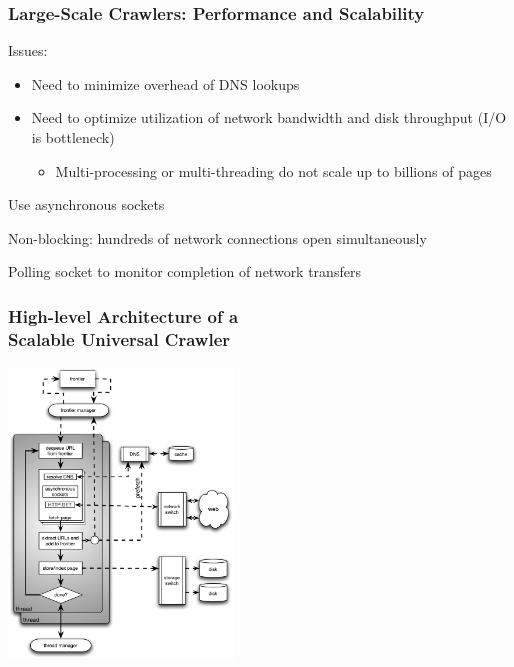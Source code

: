 \documentclass{beamer}
\begin{document}
\begin{frame} \frametitle{Large-Scale Crawlers: Performance and Scalability}

\begin{block}{Issues:}
\begin{itemize}
  \item Need to minimize overhead of DNS lookups
  \item Need to optimize utilization of network bandwidth and disk
    throughput (I/O is bottleneck) 
    \begin{itemize}
        \item Multi-processing or multi-threading do not scale up to billions of pages
    \end{itemize}
\end{itemize}
\end{block}

\begin{block}{Use asynchronous sockets}


Non-blocking: hundreds of network connections open simultaneously

Polling socket to monitor completion of network transfers
\end{block}

\end{frame}

\begin{frame} \frametitle{High-level Architecture of a \\ Scalable Universal Crawler}

      \includegraphics[width=6cm]{scalable-crawler-arch}

\end{frame}
\end{document}
